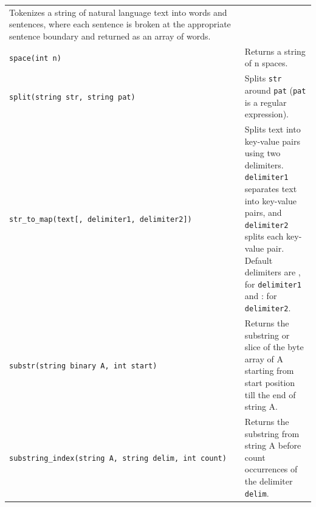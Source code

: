 \documentclass[
]{article}
\begin{document}
\begin{longtable}[]{@{}ll@{}}
\begin{minipage}[t]{0.55\columnwidth}
Tokenizes a string of natural language text into words and sentences,
where each sentence is broken at the appropriate sentence boundary and
returned as an array of words.\strut
\end{minipage}\tabularnewline
\begin{minipage}[t]{0.39\columnwidth}\raggedright
\texttt{space(int\ n)}\strut
\end{minipage} & \begin{minipage}[t]{0.55\columnwidth}\raggedright
Returns a string of n spaces.\strut
\end{minipage}\tabularnewline
\begin{minipage}[t]{0.39\columnwidth}\raggedright
\texttt{split(string\ str,\ string\ pat)}\strut
\end{minipage} & \begin{minipage}[t]{0.55\columnwidth}\raggedright
Splits \texttt{str} around \texttt{pat} (\texttt{pat} is a regular
expression).\strut
\end{minipage}\tabularnewline
\begin{minipage}[t]{0.39\columnwidth}\raggedright
\texttt{str\_to\_map(text{[},\ delimiter1,\ delimiter2{]})}\strut
\end{minipage} & \begin{minipage}[t]{0.55\columnwidth}\raggedright
Splits text into key-value pairs using two delimiters.
\texttt{delimiter1} separates text into key-value pairs, and
\texttt{delimiter2} splits each key-value pair. Default delimiters are ,
for \texttt{delimiter1} and : for \texttt{delimiter2}.\strut
\end{minipage}\tabularnewline
\begin{minipage}[t]{0.39\columnwidth}\raggedright
\texttt{substr(string\ binary\ A,\ int\ start)}\strut
\end{minipage} & \begin{minipage}[t]{0.55\columnwidth}\raggedright
Returns the substring or slice of the byte array of A starting from
start position till the end of string A.\strut
\end{minipage}\tabularnewline
\begin{minipage}[t]{0.39\columnwidth}\raggedright
\texttt{substring\_index(string\ A,\ string\ delim,\ int\ count)}\strut
\end{minipage} & \begin{minipage}[t]{0.55\columnwidth}\raggedright
Returns the substring from string A before count occurrences of the
delimiter \texttt{delim}.\strut
\end{minipage}\tabularnewline

\end{longtable}
\end{document}
